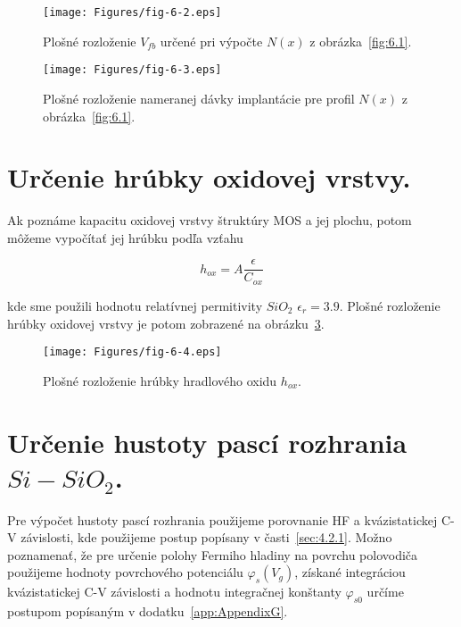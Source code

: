 \begin{figure}[h!]\centering
  \texttt{[image: Figures/fig-6-2.eps]}
  \caption[Plošné rozloženie $V_{fb}$]{Plošné rozloženie $V_{fb}$
    určené pri výpočte $N(x)$ z obrázka~\ref{fig:6.1}.}\label{fig:6.2}
\end{figure}

\begin{figure}[h!]\centering
  \texttt{[image: Figures/fig-6-3.eps]}
  \caption[Plošné rozloženie nameranej dávky implantácie]{Plošné
    rozloženie nameranej dávky implantácie pre profil $N(x)$ z
    obrázka~\ref{fig:6.1}.}\label{fig:6.3}
\end{figure}

\section{Určenie hrúbky oxidovej vrstvy.}\label{sec:6.2}

Ak poznáme kapacitu oxidovej vrstvy štruktúry MOS a jej plochu, potom
môžeme vypočítať jej hrúbku podľa vzťahu

\begin{equation}\label{eq:6.3}
  h_{ox} = A \frac{\epsilon}{C_{ox}}
\end{equation}

kde sme použili hodnotu relatívnej permitivity $SiO_{2}$
$\epsilon_{r}=3.9$. Plošné rozloženie hrúbky oxidovej vrstvy je potom
zobrazené na obrázku~\ref{fig:6.4}.

\begin{figure}[h!]\centering
  \texttt{[image: Figures/fig-6-4.eps]}
  \caption[Plošné rozloženie hrúbky hradlového oxidu $h_{ox}$]{Plošné
    rozloženie hrúbky hradlového oxidu $h_{ox}$.}\label{fig:6.4}
\end{figure}

\section{Určenie hustoty pascí rozhrania $Si-SiO_{2}$.}\label{sec:6.3}

Pre výpočet hustoty pascí rozhrania použijeme porovnanie HF a
kvázistatickej C-V závislosti, kde použijeme postup popísany v
časti~\ref{sec:4.2.1}. Možno poznamenať, že pre určenie polohy Fermiho
hladiny na povrchu polovodiča použijeme hodnoty povrchového potenciálu
$\varphi_{s}(V_{g})$, získané integráciou kvázistatickej C-V
závislosti a hodnotu integračnej konštanty $\varphi_{s0}$ určíme
postupom popísaným v dodatku~\ref{app:AppendixG}.

